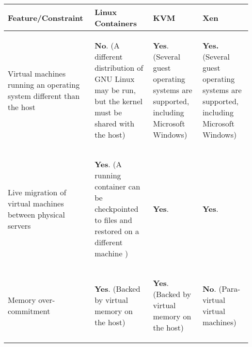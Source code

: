 \begin{table}[H]
\begin{center}
\renewcommand{\arraystretch}{1.25}
\begin{tabular}{ | p{3.25cm} | p{3.25cm} | p{3.25cm} | p{3.25cm} |}
  \hline                        
  \textbf{Feature/Constraint} & \textbf{Linux Containers} & \textbf{KVM} & \textbf{Xen}\\ \hline
  \begin{flushleft}
   Virtual machines running an operating system different than the host
   \end{flushleft} & \begin{flushleft}
  \textbf{No}. (A different distribution of GNU Linux may be run, but the kernel must be shared with the host)
   \end{flushleft} & \begin{flushleft}
   \textbf{Yes}. (Several guest operating systems are supported, including Microsoft Windows) \end{flushleft} & \begin{flushleft}  \textbf{Yes.} (Several guest operating systems are supported, including Microsoft Windows)\end{flushleft} \\ \hline 
   \begin{flushleft}
    Live migration of virtual machines between physical servers
    \end{flushleft} & \begin{flushleft}
    \textbf{Yes}. (A running container can be checkpointed to files and restored on a different machine \cite{criu})
    \end{flushleft} & \begin{flushleft}
    \textbf{Yes}.
    \end{flushleft} & \begin{flushleft}
    \textbf{Yes}.
    \end{flushleft} \\ \hline
    \begin{flushleft}
     Memory over-commitment \end{flushleft} & \begin{flushleft}
     \textbf{Yes}. (Backed by virtual memory on the host)
     \end{flushleft} & \begin{flushleft} \textbf{Yes}. (Backed by virtual memory on the host) \end{flushleft} & \begin{flushleft} \textbf{No}. (Para-virtual virtual machines)

\end{flushleft}
\end{tabular}
\end{center}
\end{table}
